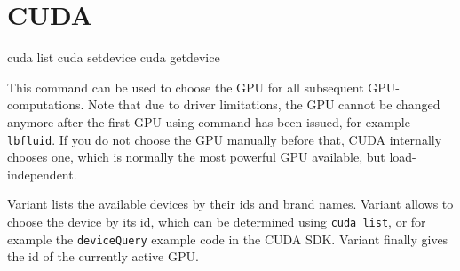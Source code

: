 \section{CUDA}
\label{sec:cuda}
\begin{essyntax}
   cuda list
   cuda setdevice 
   cuda getdevice
\end{essyntax}

This command can be used to choose the GPU for all subsequent
GPU-computations. Note that due to driver limitations, the GPU cannot
be changed anymore after the first GPU-using command has been issued,
for example \texttt{lbfluid}. If you do not choose the GPU manually
before that, CUDA internally chooses one, which is normally the most
powerful GPU available, but load-independent.

Variant  lists the available devices by their ids and brand
names. Variant  allows to choose the device by its id,
which can be determined using \texttt{cuda list}, or for example the
\texttt{deviceQuery} example code in the CUDA SDK. Variant 
finally gives the id of the currently active GPU.

